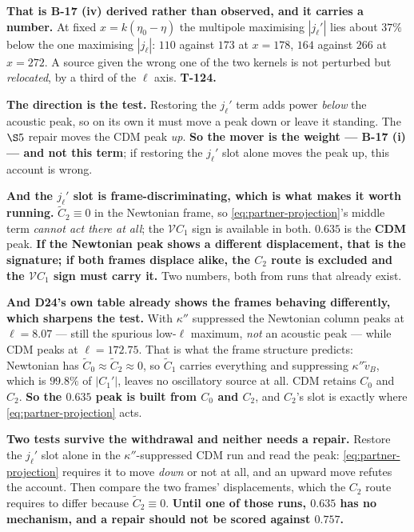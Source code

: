 \textbf{That is B-17 (iv) derived rather than observed, and it carries a
number.} At fixed $x=k(\eta_0-\eta)$ the multipole maximising $|j_\ell'|$ lies
about $37\%$ below the one maximising $|j_\ell|$: $110$ against $173$ at
$x=178$, $164$ against $266$ at $x=272$. A source given the wrong one of the
two kernels is not perturbed but \emph{relocated}, by a third of the $\ell$
axis. \textbf{T-124.}

\textbf{The direction is the test.} Restoring the $j_\ell'$ term adds power
\emph{below} the acoustic peak, so on its own it must move a peak down or leave
it standing. The $\S5$ repair moves the CDM peak \emph{up}. \textbf{So the
mover is the weight --- B-17 (i) --- and not this term}; if restoring the
$j_\ell'$ slot alone moves the peak up, this account is wrong.

\textbf{And the $j_\ell'$ slot is frame-discriminating, which is what makes it
worth running.} $\tilde C_2\equiv0$ in the Newtonian frame, so
\eqref{eq:partner-projection}'s middle term \emph{cannot act there at all};
the $\mathcal VC_1$ sign is available in both. $0.635$ is the \textbf{CDM}
peak. \textbf{If the Newtonian peak shows a different displacement, that is the
signature; if both frames displace alike, the $C_2$ route is excluded and the
$\mathcal VC_1$ sign must carry it.} Two numbers, both from runs that already
exist.

\textbf{And D24's own table already shows the frames behaving differently,
which sharpens the test.} With $\kappa''$ suppressed the Newtonian column
peaks at $\ell=8.07$ --- still the spurious low-$\ell$ maximum, \emph{not} an
acoustic peak --- while CDM peaks at $\ell=172.75$. That is what the frame
structure predicts: Newtonian has $\tilde C_0\approx\tilde C_2\approx0$, so
$\tilde C_1$ carries everything and suppressing $\kappa''\tilde v_B$, which is
$99.8\%$ of $|C_1'|$, leaves no oscillatory source at all. CDM retains $C_0$
and $C_2$. \textbf{So the $0.635$ peak is built from $C_0$ and $C_2$}, and
$C_2$'s slot is exactly where \eqref{eq:partner-projection} acts.

\textbf{Two tests survive the withdrawal and neither needs a repair.} Restore
the $j_\ell'$ slot alone in the $\kappa''$-suppressed CDM run and read the
peak: \eqref{eq:partner-projection} requires it to move \emph{down} or not at
all, and an upward move refutes the account. Then compare the two frames'
displacements, which the $C_2$ route requires to differ because
$\tilde C_2\equiv0$. \textbf{Until one of those runs, $0.635$ has no
mechanism, and a repair should not be scored against $0.757$.}


